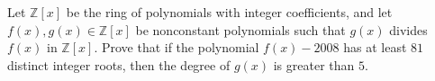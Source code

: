 \documentclass{article}
\begin{document}
\setlength{\parindent}{0pt}
Let $\mathbb{Z}[x]$ be the ring of polynomials with integer coefficients, and let $f(x),g(x)\in\mathbb{Z}[x]$ be nonconstant polynomials such that $g(x)$ divides $f(x)$ in $\mathbb{Z}[x]$. Prove that if the polynomial $f(x)-2008$ has at least $81$ distinct integer roots, then the degree of $g(x)$ is greater than $5$.
\end{document}
